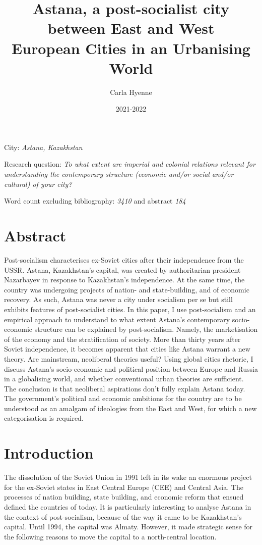 \documentclass{article}
\title{Astana, a post-socialist city between East and West 
\\[5ex] \large European Cities in an Urbanising World}
\author{Carla Hyenne}
\date{2021-2022}
\begin{document}
\maketitle 

City: \textit{Astana, Kazakhstan}

Research question: \textit{To what extent are imperial and colonial relations relevant for understanding the contemporary structure (economic and/or social and/or cultural) of your city?}

Word count excluding bibliography: \textit{3410} and abstract \textit{184} 

\section{Abstract}

Post-socialism characterises ex-Soviet cities after their independence from the USSR.
Astana, Kazakhstan's capital, was created by authoritarian president Nazarbayev in response to Kazakhstan's independence. At the same time, the country was undergoing projects of nation- and state-building, and of economic recovery. As such, Astana was never a city under socialism per se but still exhibits features of post-socialist cities. In this paper, I use post-socialism and an empirical approach to understand to what extent Astana's contemporary socio-economic structure can be explained by post-socialism. 
Namely, the marketisation of the economy and the stratification of society.
More than thirty years after Soviet independence, it becomes apparent that cities like Astana warrant a new theory. 
Are mainstream, neoliberal theories useful? Using global cities rhetoric, I discuss Astana's socio-economic and political position between Europe and Russia in a globalising world, and whether conventional urban theories are sufficient. 
The conclusion is that neoliberal aspirations don't fully explain Astana today. The government's political and economic ambitions for the country are to be understood as an amalgam of ideologies from the East and West, for which a new categorisation is required.

\pagebreak

\section{Introduction} 

The dissolution of the Soviet Union in 1991 left in its wake an enormous project for the ex-Soviet states in East Central Europe (CEE) and Central Asia. The processes of nation building, state building, and economic reform that ensued defined the countries of today. It is particularly interesting to analyse Astana in the context of post-socialism, because of the way it came to be Kazakhstan's capital. 
Until 1994, the capital was Almaty. However, it made strategic sense for the following reasons to move the capital to a north-central location. 
\end{document}
